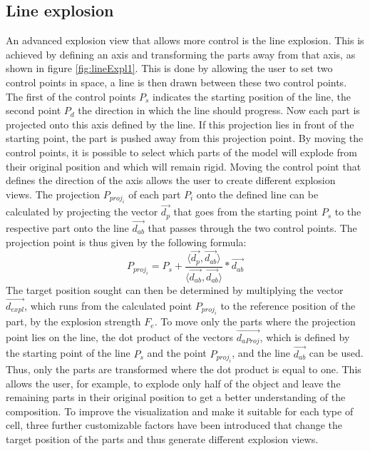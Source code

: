 \subsection{Line explosion} 
\label{lineExp}
An advanced explosion view that allows more control is the line explosion. This is achieved by defining an axis and transforming the parts away from that axis, as shown in figure \ref{fig:lineExpl1}.
This is done by allowing the user to set two control points in space, a line is then drawn between these two control points. 
The first of the control points $P_s$ indicates the starting position of the line, the second point $P_d$ the direction in which the line should progress. 
Now each part is projected onto this axis defined by the line. If this projection lies in front of the starting point, the part is pushed away from this projection point. 
By moving the control points, it is possible to select which parts of the model will explode from their original position and which will remain rigid. 
Moving the control point that defines the direction of the axis allows the user to create different explosion views.
The projection $P_{proj_i}$ of each part $P_i$ onto the defined line can be calculated by projecting the vector $\vec{d_p}$ that goes from the starting point $P_s$ to the respective part onto the line $\vec{d_{ab}}$ that passes through the two control points. 
The projection point is thus given by the following formula:
\begin{equation}
	P_{proj_i} = P_s + \frac{\langle\vec{d_p},\vec{d_{ab}}\rangle}{\langle\vec{d_{ab}},\vec{d_{ab}}\rangle} * \vec{d_{ab}}
	\label{eq:LineProj}
\end{equation}
The target position sought can then be determined by multiplying the vector $\vec{d_{expl}}$, which runs from the calculated point $P_{proj_i}$ to the reference position of the part, by the explosion strength $F_e$.
To move only the parts where the projection point lies on the line, the dot product of the vectors $\vec{d_{aProj}}$, which is defined by the starting point of the line $P_s$ and the point $P_{proj_i}$, and the line $\vec{d_{ab}}$ can be used. Thus, only the parts are transformed where the dot product is equal to one.
This allows the user, for example, to explode only half of the object and leave the remaining parts in their original position to get a better understanding of the composition. 
To improve the visualization and make it suitable for each type of cell, three further customizable factors have been introduced that change the target position of the parts and thus generate different explosion views. 
